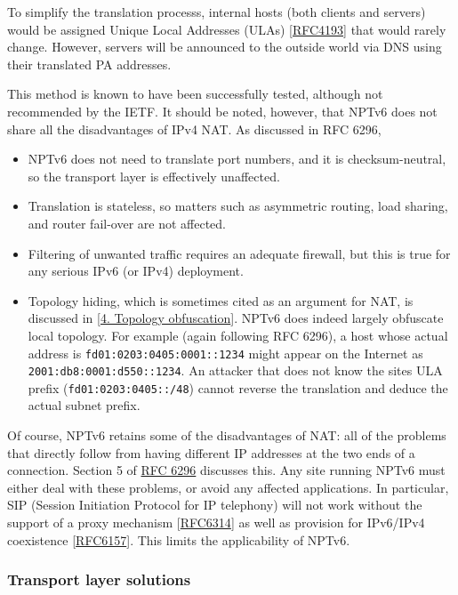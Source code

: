 \documentclass[
]{article}
\begin{document}
To simplify the translation processs, internal hosts (both clients and
servers) would be assigned Unique Local Addresses (ULAs)
{[}\href{https://www.rfc-editor.org/info/rfc4193}{RFC4193}{]} that would
rarely change. However, servers will be announced to the outside world
via DNS using their translated PA addresses.

This method is known to have been successfully tested, although not
recommended by the IETF. It should be noted, however, that NPTv6 does
not share all the disadvantages of IPv4 NAT. As discussed in RFC 6296,

\begin{itemize}
\item
  NPTv6 does not need to translate port numbers, and it is
  checksum-neutral, so the transport layer is effectively unaffected.
\item
  Translation is stateless, so matters such as asymmetric routing, load
  sharing, and router fail-over are not affected.
\item
  Filtering of unwanted traffic requires an adequate firewall, but this
  is true for any serious IPv6 (or IPv4) deployment.
\item
  Topology hiding, which is sometimes cited as an argument for NAT, is
  discussed in {[}\hyperref[topology-obfuscation]{4. Topology
  obfuscation}{]}. NPTv6 does indeed largely obfuscate local topology.
  For example (again following RFC 6296), a host whose actual address is
  \texttt{fd01:0203:0405:0001::1234} might appear on the Internet as
  \texttt{2001:db8:0001:d550::1234}. An attacker that does not know the
  site\textquotesingle s ULA prefix (\texttt{fd01:0203:0405::/48})
  cannot reverse the translation and deduce the actual subnet prefix.
\end{itemize}

Of course, NPTv6 retains some of the disadvantages of NAT: all of the
problems that directly follow from having different IP addresses at the
two ends of a connection. Section 5 of
\href{https://www.rfc-editor.org/info/rfc6296}{RFC 6296} discusses this.
Any site running NPTv6 must either deal with these problems, or avoid
any affected applications. In particular, SIP (Session Initiation
Protocol for IP telephony) will not work without the support of a proxy
mechanism {[}\href{https://www.rfc-editor.org/info/rfc6314}{RFC6314}{]}
as well as provision for IPv6/IPv4 coexistence
{[}\href{https://www.rfc-editor.org/info/rfc6157}{RFC6157}{]}. This
limits the applicability of NPTv6.

\subsubsection{Transport layer
solutions}\label{transport-layer-solutions}
\end{document}
